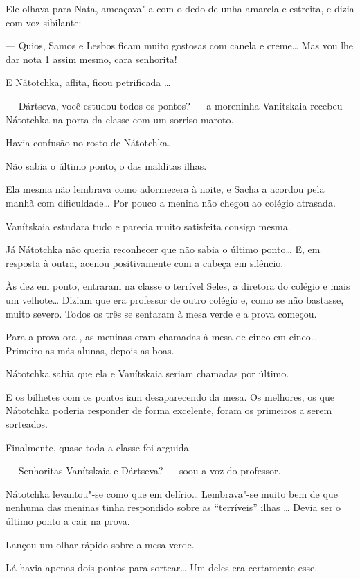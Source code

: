 Ele olhava para Nata, ameaçava"-a com o dedo de unha amarela e estreita,
e dizia com voz sibilante:

--- Quios, Samos e Lesbos ficam muito gostosas com canela e creme\ldots{} Mas
vou lhe dar nota 1 assim mesmo, cara senhorita!

E Nátotchka, aflita, ficou petrificada \ldots{}

\asterisc

--- Dártseva, você estudou todos os pontos? --- a moreninha Vanítskaia
recebeu Nátotchka na porta da classe com um sorriso maroto.

Havia confusão no rosto de Nátotchka.

Não sabia o último ponto, o das malditas ilhas.

Ela mesma não lembrava como adormecera à noite, e Sacha a acordou pela
manhã com dificuldade\ldots{} Por pouco a menina não chegou ao colégio
atrasada.

Vanítskaia estudara tudo e parecia muito satisfeita consigo mesma.

Já Nátotchka não queria reconhecer que não sabia o último ponto\ldots{} E, em
resposta à outra, acenou positivamente com a cabeça em silêncio.

Às dez em ponto, entraram na classe o terrível Seles, a diretora do
colégio e mais um velhote\ldots{} Diziam que era professor de outro colégio
e, como se não bastasse, muito severo. Todos os três se sentaram à mesa
verde e a prova começou.

Para a prova oral, as meninas eram chamadas à mesa de cinco em cinco\ldots{}
Primeiro as más alunas, depois as boas.

Nátotchka sabia que ela e Vanítskaia seriam chamadas por último.

E os bilhetes com os pontos iam desaparecendo da mesa. Os melhores, os
que Nátotchka poderia responder de forma excelente, foram os primeiros a
serem sorteados.

Finalmente, quase toda a classe foi arguida.

--- Senhoritas Vanítskaia e Dártseva? --- soou a voz do professor.

Nátotchka levantou"-se como que em delírio\ldots{} Lembrava"-se muito bem de
que nenhuma das meninas tinha respondido sobre as ``terríveis'' ilhas
\ldots{} Devia ser o último ponto a cair na prova.

Lançou um olhar rápido sobre a mesa verde.

Lá havia apenas dois pontos para sortear\ldots{} Um deles era certamente
esse.

